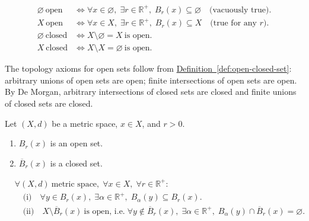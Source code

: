 \begin{remark*}
\begin{align*}
\varnothing\ \text{open}
  &\iff \forall x \in \varnothing,\;
         \exists r \in \mathbb{R}^{+},\;
         B_r(x) \subseteq \varnothing
  \quad\text{(vacuously true).} \\[4pt]
X\ \text{open}
  &\iff \forall x \in X,\;
         \exists r \in \mathbb{R}^{+},\;
         B_r(x) \subseteq X
  \quad\text{(true for any $r$).} \\[4pt]
\varnothing\ \text{closed}
  &\iff X \setminus \varnothing = X\ \text{is open.} \\[4pt]
X\ \text{closed}
  &\iff X \setminus X = \varnothing\ \text{is open.}
\end{align*}
\end{remark*}

\begin{remark*}[Consequence]
The topology axioms for open sets follow from
\hyperref[def:open-closed-set]{Definition~\ref*{def:open-closed-set}}:
arbitrary unions of open sets are open; finite intersections of open sets
are open.
By De Morgan, arbitrary intersections of closed sets are closed and finite
unions of closed sets are closed.
\end{remark*}

\begin{proposition}
\label{prop:balls-open-closed}
Let $(X,d)$ be a metric space, $x \in X$, and $r > 0$.
\begin{enumerate}[label=(\roman*)]
  \item $B_r(x)$ is an open set.
  \item $\overline{B}_r(x)$ is a closed set.
\end{enumerate}
\end{proposition}

\begin{remark*}
\begin{align*}
&\forall (X,d)\ \text{metric space},\;
 \forall x \in X,\;
 \forall r \in \mathbb{R}^{+}: \\
&\quad \text{(i)}\quad
  \forall y \in B_r(x),\;
  \exists \alpha \in \mathbb{R}^{+},\;
  B_\alpha(y) \subseteq B_r(x). \\
&\quad \text{(ii)}\quad
  X \setminus \overline{B}_r(x)\ \text{is open, i.e.}\;
  \forall y \notin \overline{B}_r(x),\;
  \exists \alpha \in \mathbb{R}^{+},\;
  B_\alpha(y) \cap \overline{B}_r(x) = \varnothing.
\end{align*}
\end{remark*}

